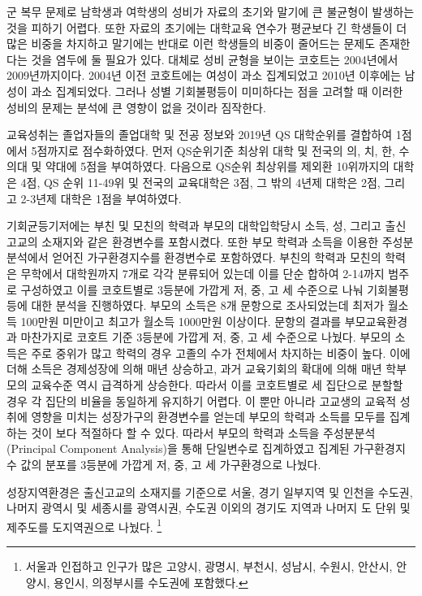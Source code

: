 군 복무 문제로 남학생과 여학생의 성비가 자료의 초기와 말기에 큰 불균형이 발생하는 것을 피하기 어렵다.
또한 자료의 초기에는 대학교육 연수가 평균보다 긴 학생들이 더 많은 비중을 차지하고 말기에는 반대로 이런 학생들의 비중이 줄어드는 문제도 존재한다는 것을 염두에 둘 필요가 있다.
대체로 성비 균형을 보이는 코호트는 2004년에서 2009년까지이다.
2004년 이전 코호트에는 여성이 과소 집계되었고 2010년 이후에는 남성이 과소 집계되었다.
그러나 성별 기회불평등이 미미하다는 점을 고려할 때 이러한 성비의 문제는 분석에 큰 영향이 없을 것이라 짐작한다.

교육성취는 졸업자들의 졸업대학 및 전공 정보와 2019년 QS 대학순위를 결합하여 1점에서 5점까지로 점수화하였다.
먼저 QS순위기준 최상위 대학 및 전국의 의, 치, 한, 수의대 및 약대에 5점을 부여하였다. 다음으로 QS순위 최상위를 제외환 10위까지의 대학은 4점, QS 순위 11-49위 및 전국의 교육대학은 3점, 그 밖의 4년제 대학은 2점, 그리고 2-3년제 대학은 1점을 부여하였다. 

기회균등기저에는 부친 및 모친의 학력과 부모의 대학입학당시 소득, 성, 그리고 출신고교의 소재지와 같은 환경변수를 포함시켰다.
또한 부모 학력과 소득을 이용한 주성분분석에서 얻어진 가구환경지수를 환경변수로 포함하였다. 
부친의 학력과 모친의 학력은 무학에서 대학원까지 7개로 각각 분류되어 있는데 이를 단순 합하여 2-14까지 범주로 구성하였고 이를 코호트별로 3등분에 가깝게 저, 중, 고 세 수준으로 나눠 기회불평등에 대한 분석을 진행하였다. 
부모의 소득은 8개 문항으로 조사되었는데 최저가 월소득 100만원 미만이고 최고가 월소득 1000만원 이상이다.
문항의 결과를 부모교육환경과 마찬가지로 코호트 기준 3등분에 가깝게 저, 중, 고 세 수준으로 나눴다. 
부모의 소득은 주로 중위가 많고 학력의 경우 고졸의 수가 전체에서 차지하는 비중이 높다.
이에 더해 소득은 경제성장에 의해 매년 상승하고, 과거 교육기회의 확대에 의해 매년 학부모의 교육수준 역시 급격하게 상승한다.
따라서 이를 코호트별로 세 집단으로 분할할 경우 각 집단의 비율을 동일하게 유지하기 어렵다.
이 뿐만 아니라 고교생의 교육적 성취에 영향을 미치는 성장가구의 환경변수를 얻는데 부모의 학력과 소득를 모두를 집계하는 것이 보다 적절하다 할 수 있다.
따라서 부모의 학력과 소득을 주성분분석(Principal Component Analysis)을 통해 단일변수로 집계하였고 집계된 가구환경지수 값의 분포를 3등분에 가깝게 저, 중, 고 세 가구환경으로 나눴다.
 
성장지역환경은 출신고교의 소재지를 기준으로 서울, 경기 일부지역 및 인천을 수도권, 나머지 광역시 및 세종시를 광역시권, 수도권 이외의 경기도 지역과 나머지 도 단위 및 제주도를 도지역권으로 나눴다.
\footnote{서울과 인접하고 인구가 많은 고양시, 광명시, 부천시, 성남시, 수원시, 안산시, 안양시, 용인시, 의정부시를 수도권에 포함했다.}

